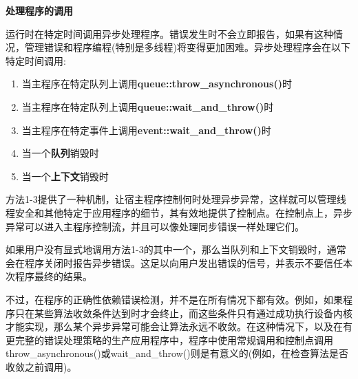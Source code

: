 \hspace*{\fill} \par %
\textbf{处理程序的调用}

运行时在特定时间调用异步处理程序。错误发生时不会立即报告，如果有这种情况，管理错误和程序编程(特别是多线程)将变得更加困难。异步处理程序会在以下特定时间调用:\par

\begin{enumerate}
	\item 当主程序在特定队列上调用\textbf{queue::throw\_asynchronous()}时
	\item 当主程序在特定队列上调用\textbf{queue::wait\_and\_throw()}时
	\item 当主程序在特定事件上调用\textbf{event::wait\_and\_throw()}时
	\item 当一个\textbf{队列}销毁时
	\item 当一个\textbf{上下文}销毁时
\end{enumerate}

方法1-3提供了一种机制，让宿主程序控制何时处理异步异常，这样就可以管理线程安全和其他特定于应用程序的细节，其有效地提供了控制点。在控制点上，异步异常可以进入主程序控制流，并且可以像处理同步错误一样处理它们。\par

如果用户没有显式地调用方法1-3的其中一个，那么当队列和上下文销毁时，通常会在程序关闭时报告异步错误。这足以向用户发出错误的信号，并表示不要信任本次程序最终的结果。\par

不过，在程序的正确性依赖错误检测，并不是在所有情况下都有效。例如，如果程序只在某些算法收敛条件达到时才会终止，而这些条件只有通过成功执行设备内核才能实现，那么某个异步异常可能会让算法永远不收敛。在这种情况下，以及在有更完整的错误处理策略的生产应用程序中，程序中使用常规调用和控制点调用throw\_asynchronous()或wait\_and\_throw()则是有意义的(例如，在检查算法是否收敛之前调用)。\par



















